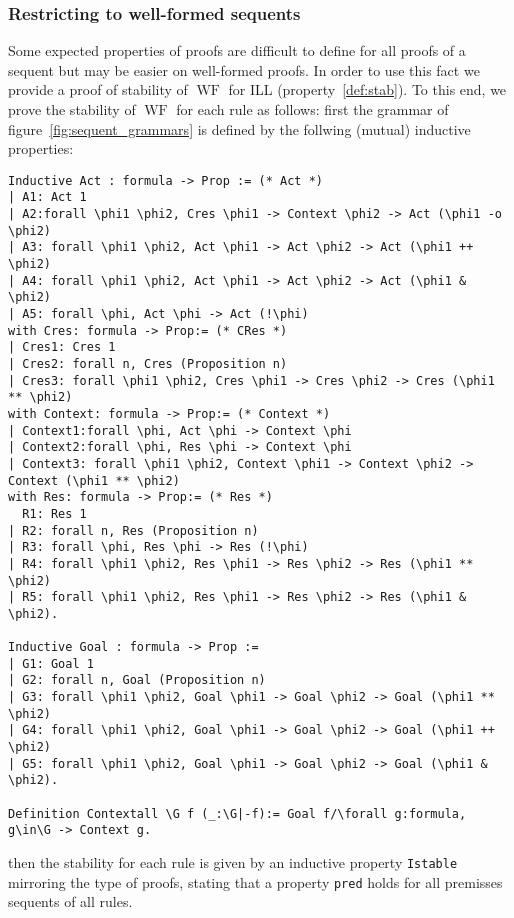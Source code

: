 \documentclass[runningheads,a4paper]{llncs}
\DeclareMathOperator{\wf}{WF}
\begin{document}
\subsubsection{Restricting to well-formed sequents}
\label{sec:restrict}

Some expected properties of proofs are difficult to define for all
proofs of a sequent but may be easier on well-formed proofs. In order
to use this fact we provide a proof of stability of $\wf$ for ILL
(property~\ref{def:stab}). To this end, we prove the stability of
$\wf$ for each rule as follows: first the grammar of
figure~\ref{fig:sequent_grammars} is defined by the follwing (mutual)
inductive properties:
\begin{lstlisting}
Inductive Act : formula -> Prop := (* Act *)
| A1: Act 1
| A2:forall \phi1 \phi2, Cres \phi1 -> Context \phi2 -> Act (\phi1 -o \phi2)
| A3: forall \phi1 \phi2, Act \phi1 -> Act \phi2 -> Act (\phi1 ++ \phi2)
| A4: forall \phi1 \phi2, Act \phi1 -> Act \phi2 -> Act (\phi1 & \phi2)
| A5: forall \phi, Act \phi -> Act (!\phi)
with Cres: formula -> Prop:= (* CRes *)
| Cres1: Cres 1
| Cres2: forall n, Cres (Proposition n)
| Cres3: forall \phi1 \phi2, Cres \phi1 -> Cres \phi2 -> Cres (\phi1 ** \phi2)
with Context: formula -> Prop:= (* Context *)
| Context1:forall \phi, Act \phi -> Context \phi
| Context2:forall \phi, Res \phi -> Context \phi
| Context3: forall \phi1 \phi2, Context \phi1 -> Context \phi2 -> Context (\phi1 ** \phi2)
with Res: formula -> Prop:= (* Res *)
  R1: Res 1
| R2: forall n, Res (Proposition n)
| R3: forall \phi, Res \phi -> Res (!\phi)
| R4: forall \phi1 \phi2, Res \phi1 -> Res \phi2 -> Res (\phi1 ** \phi2)
| R5: forall \phi1 \phi2, Res \phi1 -> Res \phi2 -> Res (\phi1 & \phi2).

Inductive Goal : formula -> Prop :=
| G1: Goal 1
| G2: forall n, Goal (Proposition n)
| G3: forall \phi1 \phi2, Goal \phi1 -> Goal \phi2 -> Goal (\phi1 ** \phi2)
| G4: forall \phi1 \phi2, Goal \phi1 -> Goal \phi2 -> Goal (\phi1 ++ \phi2)
| G5: forall \phi1 \phi2, Goal \phi1 -> Goal \phi2 -> Goal (\phi1 & \phi2).

Definition Contextall \G f (_:\G|-f):= Goal f/\forall g:formula, g\in\G -> Context g.
\end{lstlisting}
then the stability for each rule is given by an inductive property
\texttt{Istable} mirroring the type of proofs, stating that a property
\texttt{pred} holds for all premisses sequents of all rules.
\end{document}
